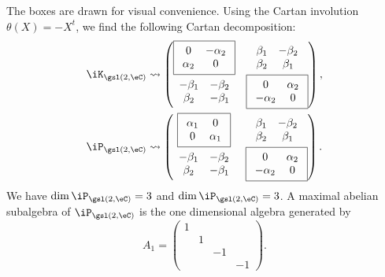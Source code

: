 The boxes are drawn for visual convenience.  Using the Cartan involution $\theta(X)=-X^t$, we find the following Cartan decomposition:
\begin{equation}
\begin{split}
\iK_{\gsl(2,\eC)}&\leadsto
\begin{pmatrix}
\boxed{
\begin{array}{cc}
0&-\alpha_2\\
\alpha_2&0
\end{array}
}&
\begin{array}{cc}
\beta_1&-\beta_2\\
\beta_2&\beta_1
\end{array}\\
\begin{array}{cc}
-\beta_1&-\beta_2\\
\beta_2&-\beta_1
\end{array}&
\boxed{
\begin{array}{cc}
0&\alpha_2\\
-\alpha_2&0
\end{array}
}
\end{pmatrix},\\
\iP_{\gsl(2,\eC)}&\leadsto
\begin{pmatrix}
\boxed{
\begin{array}{cc}
\alpha_1&0\\
0&\alpha_1
\end{array}
}&
\begin{array}{cc}
\beta_1&-\beta_2\\
\beta_2&\beta_1
\end{array}\\
\begin{array}{cc}
-\beta_1&-\beta_2\\
\beta_2&-\beta_1
\end{array}&
\boxed{
\begin{array}{cc}
0&\alpha_2\\
-\alpha_2&0
\end{array}
}
\end{pmatrix}.
\end{split}
\end{equation}
We have $\dim\iP_{\gsl(2,\eC)}=3$ and $\dim\iP_{\gsl(2,\eC)}=3$. A maximal abelian subalgebra of $\iP_{\gsl(2,\eC)}$ is the one dimensional algebra generated by
\[
  A_1=
\begin{pmatrix}
1\\&1\\&&-1\\&&&-1
\end{pmatrix}.
\]

